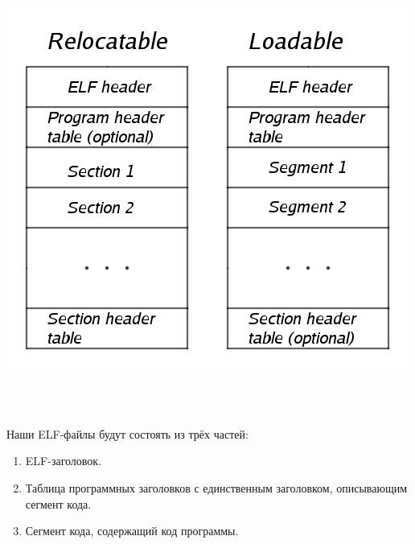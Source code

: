 \documentclass[11pt]{book}
\begin{document}
\begin{minipage}{0.5\textwidth}
\centering
\includegraphics[width=\textwidth]{pic/elf.png}
\end{minipage}
\\ \\
\begin{minipage}{0.75\textwidth}
Наши ELF-файлы будут состоять из трёх частей:
\begin{enumerate}
\item ELF-заголовок.
\item Таблица программных заголовков с единственным заголовком, описывающим сегмент кода.
\item Сегмент кода, содержащий код программы.
\end{enumerate}
\end{minipage}
\end{document}
